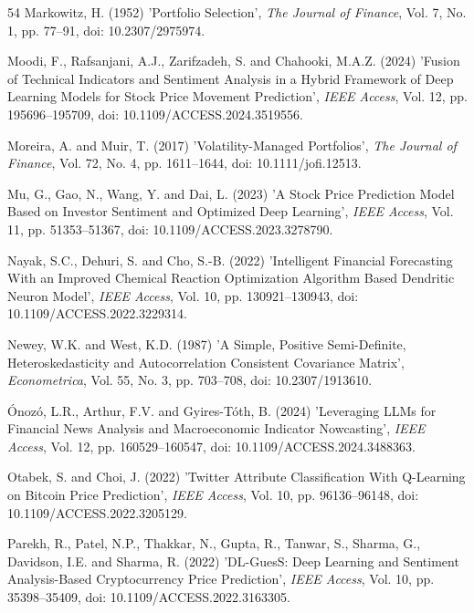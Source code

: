\begin{thebibliography}{54}
Markowitz, H. (1952) 'Portfolio Selection', {\it The Journal of Finance}, Vol. 7, No. 1, pp. 77--91, doi: 10.2307/2975974.

Moodi, F., Rafsanjani, A.J., Zarifzadeh, S. and Chahooki, M.A.Z. (2024) 'Fusion of Technical Indicators and Sentiment Analysis in a Hybrid Framework of Deep Learning Models for Stock Price Movement Prediction', {\it IEEE Access}, Vol. 12, pp. 195696--195709, doi: 10.1109/ACCESS.2024.3519556.

Moreira, A. and Muir, T. (2017) 'Volatility-Managed Portfolios', {\it The Journal of Finance}, Vol. 72, No. 4, pp. 1611--1644, doi: 10.1111/jofi.12513.

Mu, G., Gao, N., Wang, Y. and Dai, L. (2023) 'A Stock Price Prediction Model Based on Investor Sentiment and Optimized Deep Learning', {\it IEEE Access}, Vol. 11, pp. 51353--51367, doi: 10.1109/ACCESS.2023.3278790.

Nayak, S.C., Dehuri, S. and Cho, S.-B. (2022) 'Intelligent Financial Forecasting With an Improved Chemical Reaction Optimization Algorithm Based Dendritic Neuron Model', {\it IEEE Access}, Vol. 10, pp. 130921--130943, doi: 10.1109/ACCESS.2022.3229314.

Newey, W.K. and West, K.D. (1987) 'A Simple, Positive Semi-Definite, Heteroskedasticity and Autocorrelation Consistent Covariance Matrix', {\it Econometrica}, Vol. 55, No. 3, pp. 703--708, doi: 10.2307/1913610.

\'Onoz\'o, L.R., Arthur, F.V. and Gyires-T\'oth, B. (2024) 'Leveraging LLMs for Financial News Analysis and Macroeconomic Indicator Nowcasting', {\it IEEE Access}, Vol. 12, pp. 160529--160547, doi: 10.1109/ACCESS.2024.3488363.

Otabek, S. and Choi, J. (2022) 'Twitter Attribute Classification With Q-Learning on Bitcoin Price Prediction', {\it IEEE Access}, Vol. 10, pp. 96136--96148, doi: 10.1109/ACCESS.2022.3205129.

Parekh, R., Patel, N.P., Thakkar, N., Gupta, R., Tanwar, S., Sharma, G., Davidson, I.E. and Sharma, R. (2022) 'DL-GuesS: Deep Learning and Sentiment Analysis-Based Cryptocurrency Price Prediction', {\it IEEE Access}, Vol. 10, pp. 35398--35409, doi: 10.1109/ACCESS.2022.3163305.


\end{thebibliography}
